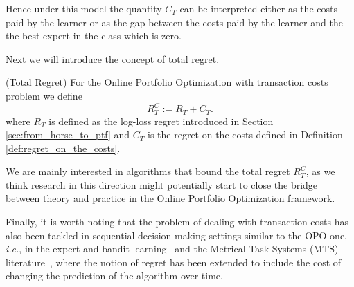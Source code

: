 Hence under this model the quantity $C_T$ can be interpreted either as the costs paid by the learner or as the gap between the costs paid by the learner and the the best expert in the class which is zero.

Next we will introduce the concept of total regret.

\begin{definition}(Total Regret)\label{def:totoal_regret}
For the Online Portfolio Optimization with transaction costs problem we define 
\begin{equation}
R_T^C:=R_T+C_T.
\end{equation}
where $R_T$ is defined as the log-loss regret introduced in Section \ref{sec:from_horse_to_ptf} and $C_T$ is the regret on the costs defined in Definition \ref{def:regret_on_the_costs}.
\end{definition}

We are mainly interested in algorithms that bound the total regret $R_T^C$, as we think research in this direction might potentially start to close the bridge between theory and practice in the Online Portfolio Optimization framework.

Finally, it is worth noting that the problem of dealing with transaction costs has also been tackled in sequential decision-making settings similar to the OPO one, \emph{i.e.}, in the expert and bandit learning~\cite{li2018online,cesa2013online,trovo2016budgeted} and the Metrical Task Systems (MTS) literature~\cite{lin2012online}, where the notion of regret has been extended to include the cost of changing the prediction of the algorithm over time.


